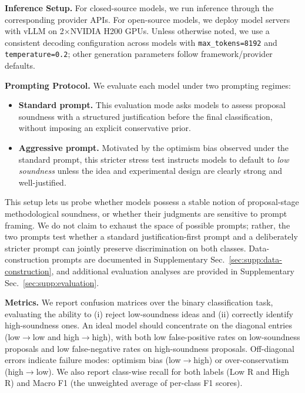 \textbf{Inference Setup.}
For closed-source models, we run inference through the corresponding provider APIs. For open-source models, we deploy model servers with vLLM on 2$\times$NVIDIA H200 GPUs. Unless otherwise noted, we use a consistent decoding configuration across models with \texttt{max\_tokens=8192} and \texttt{temperature=0.2}; other generation parameters follow framework/provider defaults.



\textbf{Prompting Protocol.}
We evaluate each model under two prompting regimes:
\begin{itemize}[leftmargin=*,itemsep=0in, topsep=0in, parsep=0in]
    \item \textbf{Standard prompt.} This evaluation mode asks models to assess proposal soundness with a structured justification before the final classification, without imposing an explicit conservative prior.
    \item \textbf{Aggressive prompt.} Motivated by the optimism bias observed under the standard prompt, this stricter stress test instructs models to default to \textit{low soundness} unless the idea and experimental design are clearly strong and well-justified.
\end{itemize}

This setup lets us probe whether models possess a stable notion of proposal-stage methodological soundness, or whether their judgments are sensitive to prompt framing. We do not claim to exhaust the space of possible prompts; rather, the two prompts test whether a standard justification-first prompt and a deliberately stricter prompt can jointly preserve discrimination on both classes. Data-construction prompts are documented in Supplementary Sec.~\ref{sec:supp:data-construction}, and additional evaluation analyses are provided in Supplementary Sec.~\ref{sec:supp:evaluation}.



\textbf{Metrics.}
We report confusion matrices over the binary classification task, evaluating the ability to (i) reject low-soundness ideas and (ii) correctly identify high-soundness ones. An ideal model should concentrate on the diagonal entries (low$\rightarrow$low and high$\rightarrow$high), with both low false-positive rates on low-soundness proposals and low false-negative rates on high-soundness proposals. Off-diagonal errors indicate failure modes: optimism bias (low$\rightarrow$high) or over-conservatism (high$\rightarrow$low). We also report class-wise recall for both labels (Low R and High R) and Macro F1 (the unweighted average of per-class F1 scores).



